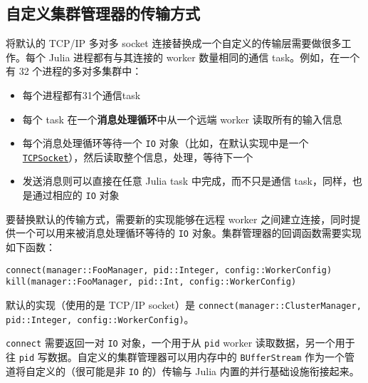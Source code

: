 \hypertarget{5280019525649403200}{}


\subsection{自定义集群管理器的传输方式}



将默认的 TCP/IP 多对多 socket 连接替换成一个自定义的传输层需要做很多工作。每个 Julia 进程都有与其连接的 worker 数量相同的通信 task。例如，在一个有 32 个进程的多对多集群中：



\begin{itemize}
\item 每个进程都有31个通信task


\item 每个 task 在一个\textbf{消息处理循环}中从一个远端 worker 读取所有的输入信息


\item 每个消息处理循环等待一个 \texttt{IO} 对象（比如，在默认实现中是一个 \hyperlink{5453047654537213204}{\texttt{TCPSocket}}），然后读取整个信息，处理，等待下一个


\item 发送消息则可以直接在任意 Julia task 中完成，而不只是通信 task，同样，也是通过相应的 \texttt{IO} 对象

\end{itemize}


要替换默认的传输方式，需要新的实现能够在远程 worker 之间建立连接，同时提供一个可以用来被消息处理循环等待的 \texttt{IO} 对象。集群管理器的回调函数需要实现如下函数：




\begin{verbatim}
connect(manager::FooManager, pid::Integer, config::WorkerConfig)
kill(manager::FooManager, pid::Int, config::WorkerConfig)
\end{verbatim}



默认的实现（使用的是 TCP/IP socket）是 \texttt{connect(manager::ClusterManager, pid::Integer, config::WorkerConfig)}。



\texttt{connect} 需要返回一对 \texttt{IO} 对象，一个用于从 \texttt{pid} worker 读取数据，另一个用于往 \texttt{pid} 写数据。自定义的集群管理器可以用内存中的 \texttt{BUfferStream} 作为一个管道将自定义的（很可能是非 \texttt{IO} 的）传输与 Julia 内置的并行基础设施衔接起来。



